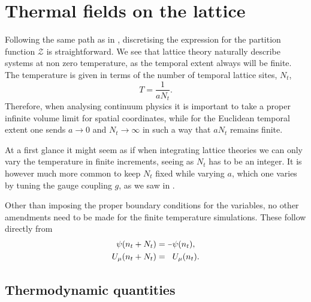 \section{Thermal fields on the lattice} \label{sec:thermal-lattice-theory}

Following the same path as in , discretising the
expression for the partition function $\mathcal{Z}$ is straightforward. We see
that lattice theory naturally describe systems at non zero temperature, as the
temporal extent always will be finite. The temperature is given in terms of the
number of temporal lattice sites, $N_t$,
%
\begin{equation}
  T = \frac{1}{a N_t}.
\end{equation}
%
Therefore, when analysing continuum physics it is important to take a proper
infinite volume limit for spatial coordinates, while for the Euclidean temporal
extent one sends $a\to0$ and $N_t\to\infty$ in such a way that $a N_t$ remains
finite.

At a first glance it might seem as if when integrating lattice theories we can
only vary the temperature in finite increments, seeing as $N_t$ has to be an integer.
It is however much more common to keep $N_t$ fixed while varying $a$, which one
varies by tuning the gauge coupling $g$, as we saw in .

Other than imposing the proper boundary conditions for the variables, no other
amendments need to be made for the finite temperature simulations. These follow
directly from 
%
\begin{align}
  \psi(n_t + N_t) &= \minus \psi(n_t), \\
  U_{\mu}(n_t + N_t) &= \hphantom{\minus} U_{\mu}(n_t).
\end{align}

\subsection{Thermodynamic quantities}

